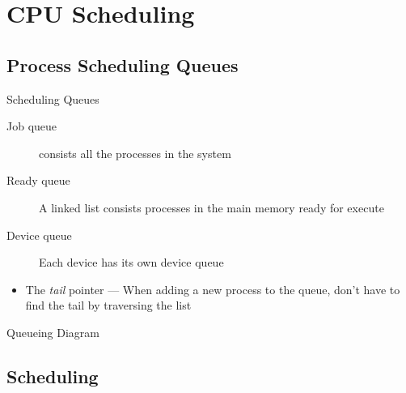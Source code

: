 
\section{CPU Scheduling}
\label{sec:cpu-scheduling}

\subsection{Process Scheduling Queues}
\label{sec:proc-sched-queu}

\begin{frame}{Scheduling Queues}
  \begin{description}
  \item[Job queue] consists all the processes in the system
  \item[Ready queue] A linked list consists processes in the main memory ready for execute
  \item[Device queue] Each device has its own device queue
  \end{description}
\end{frame}

\begin{frame}
  \centering
\end{frame}

\begin{itemize}
\item The \emph{tail} pointer --- When adding a new process to the queue, don't have
    to find the tail by traversing the list
\end{itemize}

\begin{frame}{Queueing Diagram}
  \centering
  \mode<beamer>{ \texttt{[image: queueing-dia]} }%
\end{frame}

\subsection{Scheduling}
\label{sec:scheduling}

